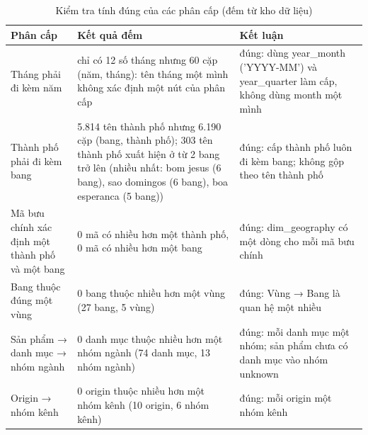 \begin{table}[htbp]\centering\scriptsize\caption{Kiểm tra tính đúng của các phân cấp (đếm từ kho dữ liệu)}\label{tab:hier-checks}
\begin{tabular}{p{3.6cm}p{7.2cm}p{4.6cm}}\toprule
\textbf{Phân cấp} & \textbf{Kết quả đếm} & \textbf{Kết luận}\\\midrule
Tháng phải đi kèm năm & chỉ có 12 số tháng nhưng 60 cặp (năm, tháng): tên tháng một mình không xác định một nút của phân cấp & đúng: dùng year\_month ('YYYY-MM') và year\_quarter làm cấp, không dùng month một mình\\
Thành phố phải đi kèm bang & 5.814 tên thành phố nhưng 6.190 cặp (bang, thành phố); 303 tên thành phố xuất hiện ở từ 2 bang trở lên (nhiều nhất: bom jesus (6 bang), sao domingos (6 bang), boa esperanca (5 bang)) & đúng: cấp thành phố luôn đi kèm bang; không gộp theo tên thành phố\\
Mã bưu chính xác định một thành phố và một bang & 0 mã có nhiều hơn một thành phố, 0 mã có nhiều hơn một bang & đúng: dim\_geography có một dòng cho mỗi mã bưu chính\\
Bang thuộc đúng một vùng & 0 bang thuộc nhiều hơn một vùng (27 bang, 5 vùng) & đúng: Vùng → Bang là quan hệ một nhiều\\
Sản phẩm → danh mục → nhóm ngành & 0 danh mục thuộc nhiều hơn một nhóm ngành (74 danh mục, 13 nhóm ngành) & đúng: mỗi danh mục một nhóm; sản phẩm chưa có danh mục vào nhóm unknown\\
Origin → nhóm kênh & 0 origin thuộc nhiều hơn một nhóm kênh (10 origin, 6 nhóm kênh) & đúng: mỗi origin một nhóm kênh\\
\bottomrule\end{tabular}\end{table}
